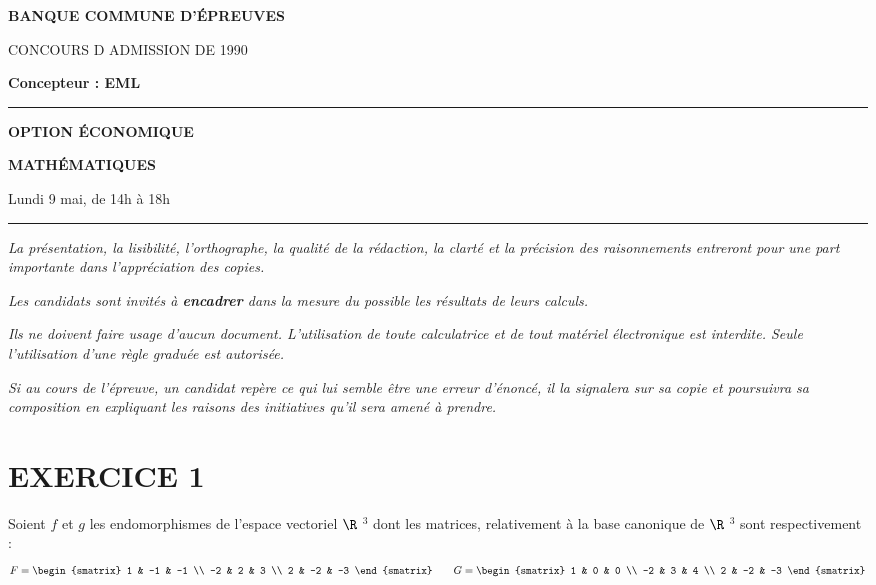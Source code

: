 \documentclass[11pt]{article}%
\begin{document}

\begin{center}
{\LARG\E\textbf{BANQUE COMMUNE D'ÉPREUVES}}



{\large \textsc{CONCOURS D ADMISSION DE 1990}}



{\large \textbf{Concepteur : EML}}



\rule{2.39cm}{0.05cm}



{\Large \textbf{OPTION ÉCONOMIQUE}}



{\Large \textbf{MATHÉMATIQUES }}



{\Large Lundi 9 mai, de 14h à 18h}



\rule{2.39cm}{0.05cm}
\end{center}

\textit{La présentation, la lisibilité, l'orthographe, la qualité
de la rédaction, la clarté et la précision des raisonnements
entreront pour une part importante dans l'appréciation des copies.}

\textit{Les candidats sont invités à \textbf{encadrer} dans la mesure
du possible les résultats de leurs calculs.}

\textit{Ils ne doivent faire usage d'aucun document. L'utilisation de
toute
calculatrice et de tout matériel électronique est interdite. Seule
l'utilisation d'une règle graduée est autorisée.}

\textit{Si au cours de l'épreuve, un candidat repère ce qui lui semble
être une erreur d'énoncé, il la signalera sur sa copie et
poursuivra sa composition en expliquant les raisons des initiatives
qu'il sera
amené à prendre.}

\vspace*{3cm}

\section*{EXERCICE 1}

Soient $f$ et $g$ les endomorphismes de l'espace vectoriel $\R$ $^{3} $
dont les matrices, relativement à la base canonique de $\R$ $^{3}$ sont
respectivement : 
\[
F = 
\begin{smatrix}
1 & -1 & -1 \\
-2 & 2 & 3 \\
2 & -2 & -3
\end{smatrix}
\qquad G = 
\begin{smatrix}
1 & 0 & 0 \\
-2 & 3 & 4 \\
2 & -2 & -3
\end{smatrix}
\]
\end{document}
